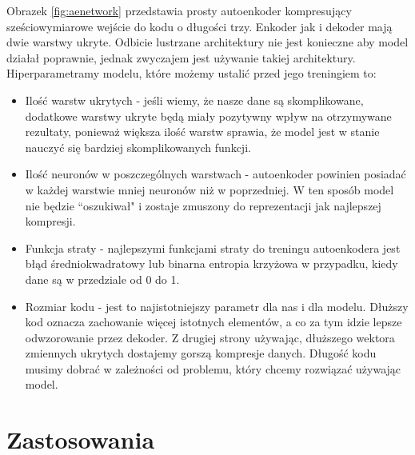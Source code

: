 \documentclass[a4paper,12pt]{book} %
\begin{document}
Obrazek \ref{fig:aenetwork} przedstawia prosty autoenkoder kompresujący sześciowymiarowe wejście do kodu o długości trzy. Enkoder jak i dekoder mają dwie warstwy ukryte. Odbicie lustrzane architektury nie jest konieczne aby model działał poprawnie, jednak zwyczajem jest używanie takiej architektury.\\
Hiperparametramy modelu, które możemy ustalić przed jego treningiem to:
\begin{itemize}
	\item Ilość warstw ukrytych - jeśli wiemy, że nasze dane są skomplikowane, dodatkowe warstwy ukryte będą miały pozytywny wpływ na otrzymywane rezultaty, ponieważ większa ilość warstw sprawia, że model jest w stanie nauczyć się bardziej skomplikowanych funkcji.\cite{telgarsky2016benefits, eldan2016power}
	\item Ilość neuronów w poszczególnych warstwach - autoenkoder powinien posiadać w każdej warstwie mniej neuronów niż w poprzedniej. W ten sposób model nie będzie ``oszukiwał" i zostaje zmuszony do reprezentacji jak najlepszej kompresji.
	\item Funkcja straty - najlepszymi funkcjami straty do treningu autoenkodera jest błąd średniokwadratowy lub binarna entropia krzyżowa w przypadku, kiedy dane są w przedziale od 0 do 1.
	\item Rozmiar kodu - jest to najistotniejszy parametr dla nas i dla modelu. Dłuższy kod oznacza zachowanie więcej istotnych elementów, a co za tym idzie lepsze odwzorowanie przez dekoder. Z drugiej strony używając, dłuższego wektora zmiennych ukrytych dostajemy gorszą kompresje danych. Długość kodu musimy dobrać w zależności od problemu, który chcemy rozwiązać używając model.
\end{itemize}
\section{Zastosowania}
\end{document}
